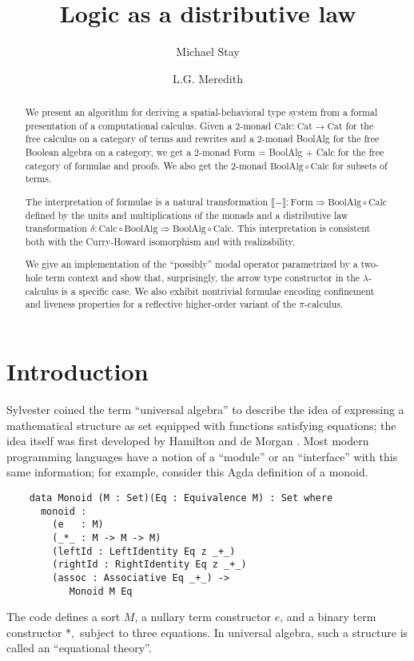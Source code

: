 \documentclass{llncs}
\title{Logic as a distributive law}
\author{
Michael Stay\inst{1}\\
\and
L.G. Meredith\inst{2}\\
}
\institute{
  {Pyrofex Corp.}\\
  \email{\fontsize{8}{8}\selectfont stay@pyrofex.net}\\
  \and
  {Synereo, Ltd}\\
  \email{\fontsize{8}{8}\selectfont greg@synereo.com}
}
\newcommand{\interp}[1]{\llbracket #1 \rrbracket}
\newcommand{\maps}{\colon}
\newcommand{\Cat}{\mathrm{Cat}}
\newcommand{\Calc}{\mathrm{Calc}}
\newcommand{\BoolAlg}{\mathrm{BoolAlg}}
\renewcommand{\Form}{\mathrm{Form}}
\begin{document}
\maketitle
\begin{abstract}
\noindent
  We present an algorithm for deriving a spatial-behavioral type
  system from a formal presentation of a computational calculus.
  Given a 2-monad $\Calc\maps \Cat \to \Cat$ for the free calculus on
  a category of terms and rewrites and a 2-monad BoolAlg for the free
  Boolean algebra on a category, we get a 2-monad Form = BoolAlg +
  Calc for the free category of formulae and proofs.  We also get the
  2-monad $\BoolAlg \circ \Calc$ for subsets of terms.  

  The interpretation of formulae is a natural transformation
  $\interp{-} \maps \Form \Rightarrow \BoolAlg \circ \Calc$ defined by
  the units and multiplications of the monads and a distributive law
  transformation $\delta\maps \Calc \circ \BoolAlg \Rightarrow
  \BoolAlg \circ \Calc.$  This interpretation is consistent both with
  the Curry-Howard isomorphism and with realizability.  

  We give an implementation of the ``possibly'' modal operator
  parametrized by a two-hole term context and show that, surprisingly,
  the arrow type constructor in the $\lambda$-calculus is a specific
  case.  We also exhibit nontrivial formulae encoding confinement and
  liveness properties for a reflective higher-order variant of the
  $\pi$-calculus.  

\end{abstract}
\section{Introduction}
  
  Sylvester coined the term ``universal algebra'' to describe the idea of expressing a mathematical structure as set equipped with functions satisfying equations; the idea itself was first developed by Hamilton and de Morgan \cite{Graetzer}.  Most modern programming languages have a notion of a ``module'' or an ``interface'' with this same information; for example, consider this Agda definition of a monoid.
  \begin{verbatim}
    data Monoid (M : Set)(Eq : Equivalence M) : Set where
      monoid :
        (e   : M)
        (_*_ : M -> M -> M)
        (leftId : LeftIdentity Eq z _+_)
        (rightId : RightIdentity Eq z _+_)
        (assoc : Associative Eq _+_) ->
           Monoid M Eq
  \end{verbatim}
  The code defines a sort $M$, a nullary term constructor $e$, and a
  binary term constructor $*,$ subject to three equations. In
  universal algebra, such a structure is called an ``equational
  theory''.
  
\end{document}
